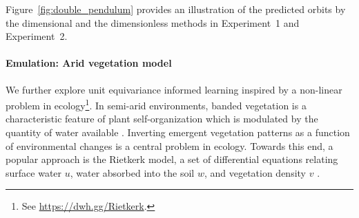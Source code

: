 \documentclass[twoside,11pt]{article}
\begin{document}
Figure~\ref{fig:double_pendulum} provides an illustration of the predicted orbits by the dimensional and the dimensionless methods in Experiment~1 and Experiment~2.

\paragraph{Emulation: Arid vegetation model}
We further explore unit equivariance informed learning inspired by a non-linear problem in ecology\footnote{See \url{https://dwh.gg/Rietkerk}.}. In semi-arid environments, banded vegetation is a characteristic feature of plant self-organization which is modulated by the quantity of water available \citep{dagbovie2014pattern}. Inverting emergent vegetation patterns as a function of environmental changes is a central problem in ecology. Towards this end, a popular approach is the Rietkerk model, a set of differential equations relating surface water $u$, water absorbed into the soil $w$, and vegetation density $v$ \citep{rietkerk}.
\end{document}
